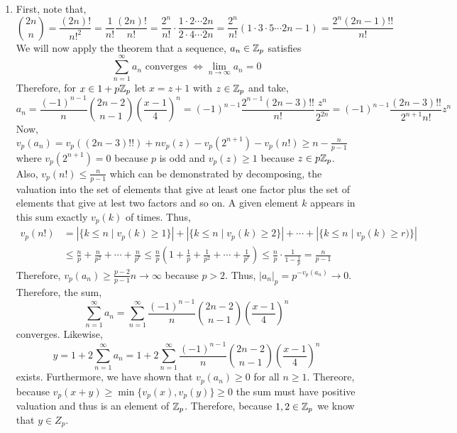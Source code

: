 \documentclass[12pt]{extarticle}
\begin{document}
\begin{enumerate}
\begin{enumerate}
\item First, note that,
\[\binom{2n}{n} = \frac{(2n)!}{n!^2} = \frac{1}{n!} \frac{(2n)!}{n!} = \frac{2^n}{n!} \cdot \frac{1 \cdot 2 \cdots 2n}{2 \cdot 4 \cdots 2n} = \frac{2^n}{n!} \left(1 \cdot 3 \cdot 5 \cdots 2n - 1\right)  = \frac{2^n (2 n - 1)!!}{n!}\]
We will now apply the theorem that a sequence, $a_n \in \mathbb{Z}_p$ satisfies
\[ \sum_{n = 1}^\infty a_n \text{ converges } \iff \lim_{n \to \infty} a_n = 0\]
Therefore, for $x \in 1 + p \mathbb{Z}_p$ let $x = z + 1$ with $z \in \mathbb{Z}_p$ and take,
\[a_n = \frac{(-1)^{n - 1}}{n} \binom{2n - 2}{n - 1} \left(\frac{x - 1}{4}\right)^n = (-1)^{n - 1} \frac{2^{n-1} (2n - 3)!!}{n!} \frac{z^n}{2^{2n}} = (-1)^{n - 1} \frac{(2n - 3)!!}{2^{n + 1} n!} z^n \]
Now, $v_p(a_n) = v_p((2n - 3)!!) + n v_p(z) - v_p(2^{n + 1}) - v_p(n!) \ge n - \frac{n}{p - 1}$ 
where $v_p(2^{n+1}) = 0$ because $p$ is odd and $v_p(z) \ge 1$ because $z \in p \mathbb{Z}_p$. Also, $v_p(n!) \le \frac{n}{p - 1}$ which can be demonstrated by decomposing, the valuation into the set of elements that give at least one factor plus the set of elements that give at lest two factors and so on. A given element $k$ appears in this sum exactly $v_p(k)$ of times. Thus,
\begin{align*}
v_p(n!) & = |\{k \le n \mid v_p(k) \ge 1 \}| + |\{k \le n \mid v_p(k) \ge 2 \}| + \cdots +  |\{k \le n \mid v_p(k) \ge r) \}|  \\ 
& \le \frac{n}{p} + \frac{n}{p^2} + \cdots + \frac{n}{p^r} \le \frac{n}{p} \left( 1 + \frac{1}{p} + \frac{1}{p^2} + \cdots + \frac{1}{p^r} \right) \le \frac{n}{p} \cdot \frac{1}{1 - \frac{1}{p}} = \frac{n}{p - 1}
\end{align*}
Therefore, $v_p(a_n) \ge \frac{p-2}{p-1} n \to \infty$ because $p > 2$. Thus, $|a_n|_p = p^{-v_p(a_n)} \to 0$. Therefore, the sum,
\[\sum_{n = 1}^\infty a_n = \sum_{n = 1}^\infty \frac{(-1)^{n - 1}}{n} \binom{2n - 2}{n - 1} \left(\frac{x - 1}{4}\right)^n \] converges. Likewise,
\[ y = 1 + 2 \sum_{n = 1}^\infty a_n = 1 + 2 \sum_{n = 1}^\infty \frac{(-1)^{n - 1}}{n} \binom{2n - 2}{n - 1} \left(\frac{x - 1}{4}\right)^n\] exists. Furthermore, we have shown that $v_p(a_n) \ge 0$ for all $n \ge 1$. Thereore, because $v_p(x + y) \ge \min\{v_p(x), v_p(y)\} \ge 0$ the sum must have positive valuation and thus is an element of $\mathbb{Z}_p$. Therefore, because $1, 2 \in \mathbb{Z}_p$ we know that $y \in Z_p$. 


\end{enumerate}
\end{enumerate}
\end{document}
